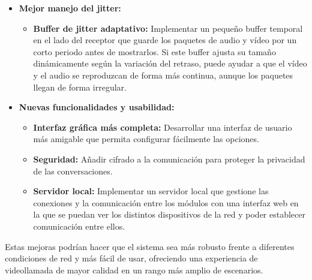 \begin{itemize}
\item \textbf{Mejor manejo del jitter:}
\begin{itemize}
    \item \textbf{Buffer de jitter adaptativo:} Implementar un pequeño buffer temporal en el lado del receptor que guarde los paquetes de audio y vídeo por un corto periodo antes de mostrarlos. Si este buffer ajusta su tamaño dinámicamente según la variación del retraso, puede ayudar a que el vídeo y el audio se reproduzcan de forma más continua, aunque los paquetes llegan de forma irregular.
\end{itemize}

\item \textbf{Nuevas funcionalidades y usabilidad:}
\begin{itemize}
    \item \textbf{Interfaz gráfica más completa:} Desarrollar una interfaz de usuario más amigable que permita configurar fácilmente las opciones.
    \item \textbf{Seguridad:} Añadir cifrado a la comunicación para proteger la privacidad de las conversaciones.
    \item \textbf{Servidor local:} Implementar un servidor local que gestione las conexiones y la comunicación entre los módulos con una interfaz web en la que se puedan ver los distintos dispositivos de la red y poder establecer comunicación entre ellos.
\end{itemize}
\end{itemize}

Estas mejoras podrían hacer que el sistema sea más robusto frente a diferentes condiciones de red y más fácil de usar, ofreciendo una experiencia de videollamada de mayor calidad en un rango más amplio de escenarios.